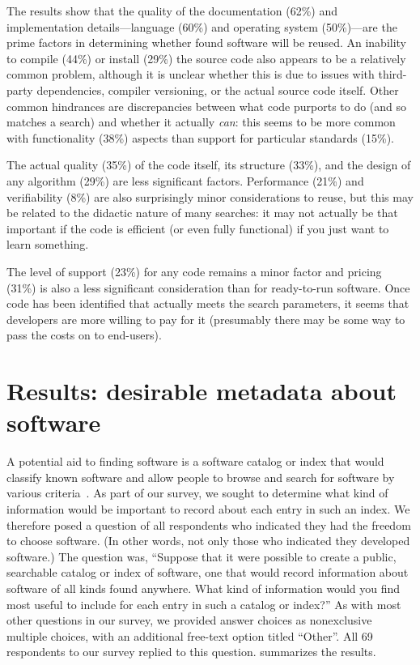 \documentclass{casicswhitepaper}
\newcommand{\totalrespondents}{69\xspace}
\begin{document}
The results show that the quality of the documentation (62\%) and implementation details---language (60\%) and operating system (50\%)---are the prime factors in determining whether found software will be reused. An inability to compile (44\%) or install (29\%) the source code also appears to be a relatively common problem, although it is unclear whether this is due to issues with third-party dependencies, compiler versioning, or the actual source code itself.  Other common hindrances are discrepancies between what code purports to do (and so matches a search) and whether it actually \emph{can}: this seems to be more common with functionality (38\%) aspects than support for particular standards (15\%).

The actual quality (35\%) of the code itself, its structure (33\%), and the design of any algorithm (29\%) are less significant factors. Performance (21\%) and verifiability (8\%) are also surprisingly minor considerations to reuse, but this may be related to the didactic nature of many searches: it may not actually be that important if the code is efficient (or even fully functional) if you just want to learn something.

The level of support (23\%) for any code remains a minor factor and pricing (31\%) is also a less significant consideration than for ready-to-run software. Once code has been identified that actually meets the search parameters, it seems that developers are more willing to pay for it (presumably there may be some way to pass the costs on to end-users).


\section{Results: desirable metadata about software}
\label{desirable-metadata}

A potential aid to finding software is a software catalog or index that would classify known software and allow people to browse and search for software by various criteria~\cite{marshall2006software}.  As part of our survey, we sought to determine what kind of information would be important to record about each entry in such an index.  We therefore posed a question of all respondents who indicated they had the freedom to choose software.  (In other words, not only those who indicated they developed software.)  The question was, ``Suppose that it were possible to create a public, searchable catalog or index of software, one that would record information about software of all kinds found anywhere.  What kind of information would you find most useful to include for each entry in such a catalog or index?''  As with most other questions in our survey, we provided answer choices as nonexclusive multiple choices, with an additional free-text option titled ``Other''.  All \totalrespondents respondents to our survey replied to this question.   summarizes the results.
\end{document}
